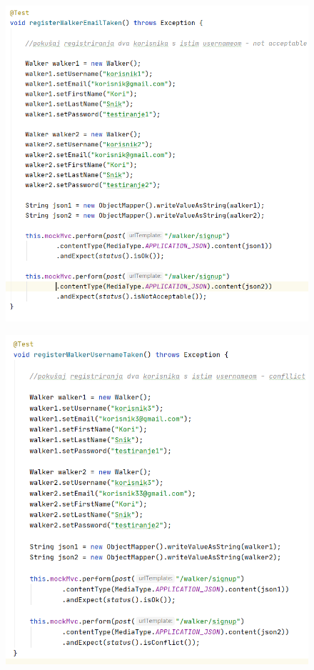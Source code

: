  			\begin{figure}[H]
 				\centerline{
 					\includegraphics[scale=0.75]{slike/walker1.PNG}} %
 				\centering
 			\end{figure}
 		
 		
 			\begin{figure}[H]
 				\includegraphics[scale=0.75]{slike/walker2.PNG} %
 				\centering
 			\end{figure}
 		

